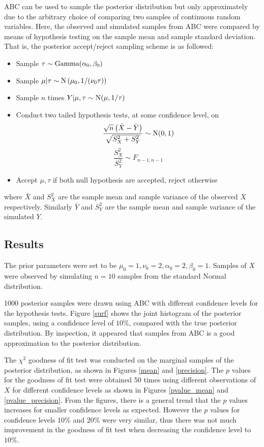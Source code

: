 \documentclass[a4paper,10pt]{article}
\begin{document}
ABC can be used to sample the posterior distribution but only approximately due to the arbitrary choice of comparing two samples of continuous random variables. Here, the observed and simulated samples from ABC were compared by means of hypothesis testing on the sample mean and sample standard deviation. That is, the posterior accept/reject sampling scheme is as followed:
\begin{itemize}
	\item Sample $\tau\sim\textup{Gamma}(\alpha_0,\beta_0)$
	\item Sample $\mu|\tau\sim\textup{N}\left(\mu_0,1/(\nu_0\tau)\right)$
	\item Sample $n$ times $Y|\mu,\tau\sim\textup{N}(\mu,1/\tau)$
	\item Conduct two tailed hypothesis tests, at some confidence level, on
	\begin{equation}
	\dfrac{\sqrt{n}\left(\bar{X}-\bar{Y}\right)}{\sqrt{S_X^2+S_Y^2}}\sim\textup{N}(0,1)
	\end{equation}
	\begin{equation}
	\dfrac{S_X^2}{S_Y^2}\sim F_{n-1,n-1}
	\end{equation}
	\item Accept $\mu,\tau$ if both null hypothesis are accepted, reject otherwise
\end{itemize}
where $\bar{X}$ and $S_X^2$ are the sample mean and sample variance of the observed $X$ respectively. Similarly $\bar{Y}$ and $S_Y^2$ are the sample mean and sample variance of the simulated $Y$.

\subsection{Results}
The prior parameters were set to be $\mu_0=1,\nu_0=2,\alpha_0=2,\beta_0=1$. Samples of $X$ were observed by simulating $n=10$ samples from the standard Normal distribution.

1000 posterior samples were drawn using ABC with different confidence levels for the hypothesis tests. Figure \ref{surf} shows the joint histogram of the posterior samples, using a confidence level of $10\%$, compared with the true posterior distribution. By inspection, it appeared that samples from ABC is a good approximation to the posterior distribution.

The $\chi^2$ goodness of fit test was conducted on the marginal samples of the posterior distribution, as shown in Figures \ref{mean} and \ref{precision}. The $p$ values for the goodness of fit test were obtained 50 times using different observations of $X$ for different confidence levels as shown in Figures \ref{pvalue_mean} and \ref{pvalue_precision}. From the figures, there is a general trend that the $p$ values increases for smaller confidence levels as expected. However the $p$ values for confidence levels $10\%$ and $20\%$ were very similar, thus there was not much improvement in the goodness of fit test when decreasing the confidence level to $10\%.$
\end{document}
